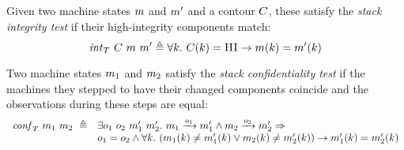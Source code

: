 \documentclass[acmsmall,review,anonymous]{acmart}\settopmatter{printfolios=true,printccs=false,printacmref=false}
\begin{document}
{\newcommand*{\vm}[1]{\ensuremath{\mathit{vm}_{#1}}}
\newcommand*{\testInt}[3]{\ensuremath{\mathit{int}_T ~ #1 ~ #2 ~ #3}}
\newcommand*{\testConf}[2]{\ensuremath{\mathit{conf}_T ~ #1 ~ #2}}
\newcommand*{\testVS}[2]{\ensuremath{\mathit{\vs}_T ~ #1 ~ #2}}
\newcommand*{\testProp}[3]{\ensuremath{\mathit{stack}_T ~ #1 ~ #2 ~ #3}}

  Given two machine states $m$ and $m'$ and a contour $C$, these
  satisfy the \emph{stack integrity test} if their high-integrity components
  match:
  \[
    \testInt{\contour}{\mach}{\mach'} \triangleq
    \forall \component . ~
    \contour(\component) = \HIGHINT \rightarrow
    \mach(\component) = \mach'(\component)
  \]

 Two machine states $m_1$ and $m_2$ satisfy the
\emph{stack confidentiality test} if the machines they stepped to
have their changed components coincide and the observations during
these steps are equal:
\[
\begin{array}{rl}
  \mathit{conf}_T ~ m_1 ~ m_2 ~ \triangleq &
  \exists o_1 ~ o_2 ~ m_1' ~ m_2'. ~
  m_1 \xrightarrow{o_1} m_1' \wedge m_2 \xrightarrow{o_2} m_2' \Rightarrow \\
&    o_1 = o_2 \wedge \forall k . ~
   (     m_1(k) \neq m_1'(k)
    \vee m_2(k) \neq m_2'(k))
    \rightarrow m_1'(k) = m_2'(k)
\end{array}
  \]

}
\end{document}
